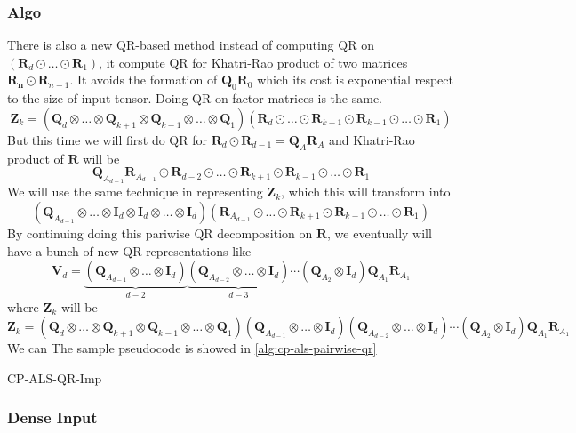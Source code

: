 \documentclass{article}
\newcommand{\mat}[1]{\mathbf{#1}}
\begin{document}
\subsubsection{Algo}
There is also a new QR-based method instead of computing QR on $(\mat{R}_d \odot \dots \odot \mat{R}_1)$, it compute QR for Khatri-Rao product of two matrices $\mat{R_n} \odot \mat{R}_{n-1}$.
It avoids the formation of $\mat{Q}_0\mat{R}_0$ which its cost is exponential respect to the size of input tensor.
Doing QR on factor matrices is the same.
$$\mat{Z}_k = (\mat{Q}_d \otimes \dots \otimes \mat{Q}_{k+1} \otimes \mat{Q}_{k-1} \otimes \dots \otimes \mat{Q}_1)(\mat{R}_d \odot \dots \odot \mat{R}_{k+1} \odot \mat{R}_{k-1} \odot \dots \odot \mat{R}_1)$$
But this time we will first do QR for $\mat{R}_d \odot \mat{R}_{d-1} = \mat{Q}_{A}\mat{R}_A$ and Khatri-Rao product of $\mat{R}$ will be 
$$\mat{Q}_{A_{d-1}}\mat{R}_{A_{d-1}} \odot \mat{R}_{d-2} \odot \dots \odot \mat{R}_{k+1} \odot \mat{R}_{k-1} \odot \dots \odot \mat{R}_1$$
We will use the same technique in representing $\mat{Z}_k$, which this will transform into 
$$(\mat{Q}_{A_{d-1}} \otimes \dots \otimes \mat{I}_d \otimes \mat{I}_d \otimes \dots  \otimes  \mat{I}_d)(\mat{R}_{A_{d-1}} \odot \dots \odot \mat{R}_{k+1} \odot \mat{R}_{k-1} \odot \dots \odot \mat{R}_1)$$
By continuing doing this pariwise QR decomposition on $\mat{R}$, we eventually will have a bunch of new QR representations like
$$\mat{V}_d = \underbrace{(\mat{Q}_{A_{d-1}} \otimes \dots  \otimes  \mat{I}_d)}_{d-2}\underbrace{(\mat{Q}_{A_{d-2}} \otimes \dots \otimes \mat{I}_d)}_{d-3} \cdots (\mat{Q}_{A_{2}} \otimes \mat{I}_d) \mat{Q}_{A_{1}}\mat{R}_{A_{1}}$$
where $\mat{Z}_k$ will be 
$$\mat{Z}_k = (\mat{Q}_d \otimes \dots \otimes \mat{Q}_{k+1} \otimes \mat{Q}_{k-1} \otimes \dots \otimes \mat{Q}_1) (\mat{Q}_{A_{d-1}} \otimes \dots  \otimes  \mat{I}_d)(\mat{Q}_{A_{d-2}} \otimes \dots \otimes \mat{I}_d) \cdots (\mat{Q}_{A_{2}} \otimes \mat{I}_d) \mat{Q}_{A_{1}}\mat{R}_{A_{1}}$$
We can 
The sample pseudocode is showed in \cref{alg:cp-als-pairwise-qr} 
\begin{algorithm}
  \caption{CP-ALS-QR-Imp}
  \label{alg:cp-als-pairwise-qr}
  
\end{algorithm}


\subsubsection{Dense Input}
\end{document}
